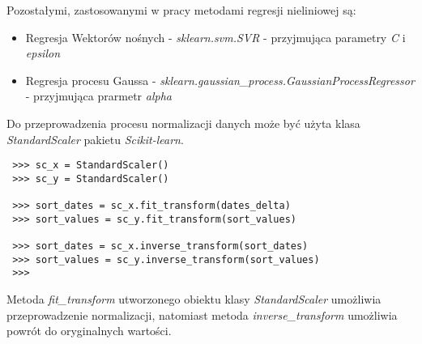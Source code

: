 Pozostałymi, zastosowanymi w pracy metodami regresji nieliniowej są:
\begin{itemize}
 \item Regresja Wektorów nośnych - \textit{sklearn.svm.SVR} - przyjmująca parametry \textit{C} i \textit{epsilon}
 \item Regresja procesu Gaussa - \textit{sklearn.gaussian\_process.GaussianProcessRegressor} - przyjmująca prarmetr \textit{alpha}\\
\end{itemize}

Do przeprowadzenia procesu normalizacji danych może być użyta klasa \textit{StandardScaler} pakietu \textit{Scikit-learn}. 
\begin{lstlisting}
 >>> sc_x = StandardScaler()
 >>> sc_y = StandardScaler()

 >>> sort_dates = sc_x.fit_transform(dates_delta)
 >>> sort_values = sc_y.fit_transform(sort_values)
 
 >>> sort_dates = sc_x.inverse_transform(sort_dates)
 >>> sort_values = sc_y.inverse_transform(sort_values)
 >>>
\end{lstlisting}

Metoda \textit{fit\_transform} utworzonego obiektu klasy \textit{StandardScaler} umożliwia przeprowadzenie normalizacji, natomiast metoda \textit{inverse\_transform} umożliwia powrót do oryginalnych wartości.



